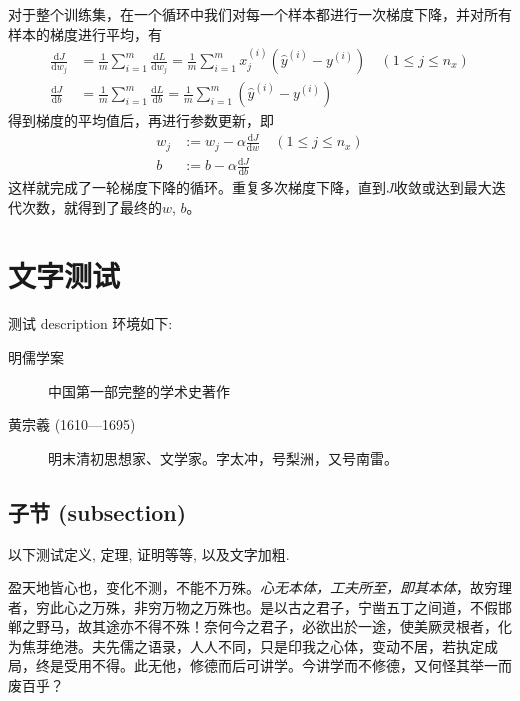 	\vspace{0.5\baselineskip}
	对于整个训练集，在一个循环中我们对每一个样本都进行一次梯度下降，并对所有样本的梯度进行平均，有
	\begin{equation}
		\begin{aligned}
			\frac{\mathrm{d}J}{\mathrm{d}w_j} &= \frac{1}{m} \sum_{i=1}^{m} \frac{\mathrm{d}L}{\mathrm{d}w_j} = \frac{1}{m} \sum_{i=1}^{m} x_j^{(i)} (\hat{y}^{(i)} - y^{(i)}) \quad (1 \leqslant j \leqslant n_x)\\
			\frac{\mathrm{d}J}{\mathrm{d}b} &= \frac{1}{m} \sum_{i=1}^{m} \frac{\mathrm{d}L}{\mathrm{d}b} = \frac{1}{m} \sum_{i=1}^{m} (\hat{y}^{(i)} - y^{(i)})
		\end{aligned}
	\end{equation}
	得到梯度的平均值后，再进行参数更新，即
	\begin{equation}
		\begin{aligned}
		w_j &:= w_j - \alpha \frac{\mathrm{d}J}{\mathrm{d}w} \quad (1 \leqslant j \leqslant n_x) \\
		b &:= b - \alpha \frac{\mathrm{d}J}{\mathrm{d}b}
		\end{aligned} 
	\end{equation}
	这样就完成了一轮梯度下降的循环。重复多次梯度下降，直到$J$收敛或达到最大迭代次数，就得到了最终的$w$, $b$。

	\section{文字测试}\label{sec:words}

	测试 \textsf{description} 环境如下:
	\begin{description}
		\item[明儒学案] 中国第一部完整的学术史著作
		\item[黄宗羲 (1610---1695)] 明末清初思想家、文学家。字太冲，号梨洲，又号南雷。
	\end{description}
	
	\subsection{子节 (subsection)}
	以下测试定义, 定理, 证明等等, 以及文字加粗.
	
	\begin{definition}
		盈天地皆心也，变化不测，不能不万殊。\emph{心无本体，工夫所至，即其本体}，故穷理者，穷此心之万殊，非穷万物之万殊也。是以古之君子，宁凿五丁之间道，不假邯郸之野马，故其途亦不得不殊！奈何今之君子，必欲出於一途，使美厥灵根者，化为焦芽绝港。夫先儒之语录，人人不同，只是印我之心体，变动不居，若执定成局，终是受用不得。此无他，修德而后可讲学。今讲学而不修德，又何怪其举一而废百乎？
	\end{definition}

